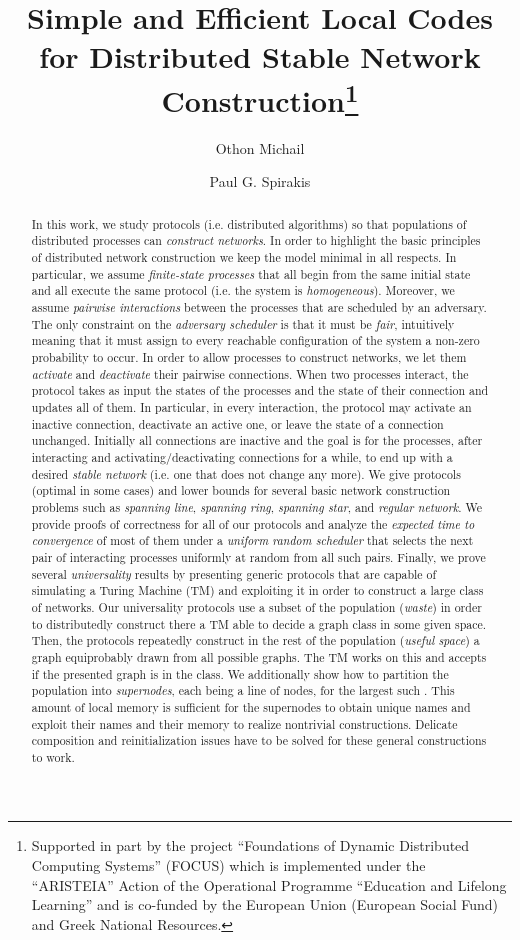 \documentclass[oribibl, 11pt]{llncs}
\title{Simple and Efficient Local Codes for Distributed Stable Network Construction\thanks{Supported in part by the project ``Foundations of Dynamic Distributed Computing Systems'' (\textsf{FOCUS}) which is implemented under the ``ARISTEIA'' Action of the  Operational Programme ``Education and Lifelong Learning'' and is co-funded by the European Union (European Social Fund) and Greek National Resources.}}
\author{Othon Michail\inst{1} \and Paul G. Spirakis\inst{1,2}}
\institute{Computer Technology Institute \& Press ``Diophantus'' (CTI), Patras, Greece \and Department of Computer Science, University of Liverpool, UK\\
Email:\email{ michailo@cti.gr, P.Spirakis@liverpool.ac.uk}}
\begin{document}
\maketitle

\begin{abstract}
In this work, we study protocols (i.e. distributed algorithms) so that populations of distributed processes can \emph{construct networks}. In order to highlight the basic principles of distributed network construction we keep the model minimal in all respects. In particular, we assume \emph{finite-state processes} that all begin from the same initial state and all execute the same protocol (i.e. the system is \emph{homogeneous}). Moreover, we assume \emph{pairwise interactions} between the processes that are scheduled by an adversary. The only constraint on the \emph{adversary scheduler} is that it must be \emph{fair}, intuitively meaning that it must assign to every reachable configuration of the system a non-zero probability to occur. In order to allow processes to construct networks, we let them \emph{activate} and \emph{deactivate} their pairwise connections. When two processes interact, the protocol takes as input the states of the processes and the state of their connection and updates all of them. In particular, in every interaction, the protocol may activate an inactive connection, deactivate an active one, or leave the state of a connection unchanged. Initially all connections are inactive and the goal is for the processes, after interacting and activating/deactivating connections for a while, to end up with a desired \emph{stable network} (i.e. one that does not change any more). We give protocols (optimal in some cases) and lower bounds for several basic network construction problems such as \emph{spanning line}, \emph{spanning ring}, \emph{spanning star}, and \emph{regular network}. We provide proofs of correctness for all of our protocols and analyze the \emph{expected time to convergence} of most of them under a \emph{uniform random scheduler} that selects the next pair of interacting processes uniformly at random from all such pairs. Finally, we prove several \emph{universality} results by presenting generic protocols that are capable of simulating a Turing Machine (TM) and exploiting it in order to construct a large class of networks. Our universality protocols use a subset of the population (\emph{waste}) in order to distributedly construct there a TM able to decide a graph class in some given space. Then, the protocols repeatedly construct in the rest of the population (\emph{useful space}) a graph equiprobably drawn from all possible graphs. The TM works on this and accepts if the presented graph is in the class. We additionally show how to partition the population into  \emph{supernodes}, each being a line of  nodes, for the largest such . This amount of local memory is sufficient for the supernodes to obtain unique names and exploit their names and their memory to realize nontrivial constructions. Delicate composition and reinitialization issues have to be solved for these general constructions to work.
\end{abstract}
\end{document}
